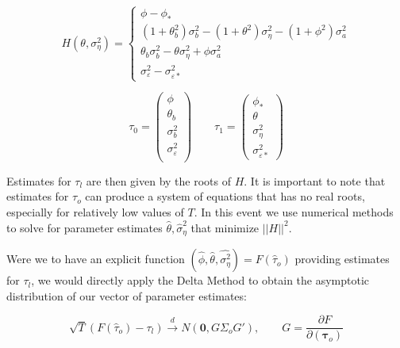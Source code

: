\begin{equation}
    H(\theta, \sigma_\eta^2) = \begin{cases}
        \phi - \phi_* \\
        (1 + \theta_b^2)\sigma_b^2 - (1 + \theta^2)\sigma_\eta^2 - (1 + \phi^2)\sigma_a^2  \\
        \theta_b\sigma_b^2 - \theta\sigma_\eta^2 + \phi\sigma_a^2\\
         \sigma_{\varepsilon}^2 - \sigma_{\varepsilon*}^2 
        \end{cases}
\end{equation}



    \begin{equation}
    \tau_0 = \left(\begin{array}{c}
     \phi\\
     \theta_b \\
     \sigma_b^2 \\
     \sigma_\varepsilon^2 \\ 
    
\end{array}\right) 
\qquad
\tau_1 = \left(\begin{array}{c}
    \phi_* \\

    \theta \\
    \sigma_\eta^2\\
        \sigma_{\varepsilon*}^2 
\end{array}\right)
\end{equation}

Estimates for $\tau_l$ are then given by the roots of $H$. It is important to note that estimates for $\tau_o$ can produce a system of equations that has no real roots, especially for relatively low values of $T$. In this event we use numerical methods to solve for parameter estimates $\hat{\theta},\hat{\sigma}_\eta^2$ that minimize $||H||^2$.

 Were we to have an explicit function $(\hat{\phi},\hat{\theta},\hat{\sigma_\eta^2}) = F(\hat{\tau}_o)$ providing estimates for $\tau_l$, we would directly apply the Delta Method \cite{casellaberger} to obtain the asymptotic distribution of our vector of parameter estimates:

\begin{equation}
        \label{eq:delta}
    \sqrt{T}(F(\hat{\tau}_o) - \tau_l) \xrightarrow{d} N(\mathbf{0},G\Sigma_oG'), \qquad G = \frac{\partial F}{\partial (\bm{\tau}_{o})}
\end{equation}

